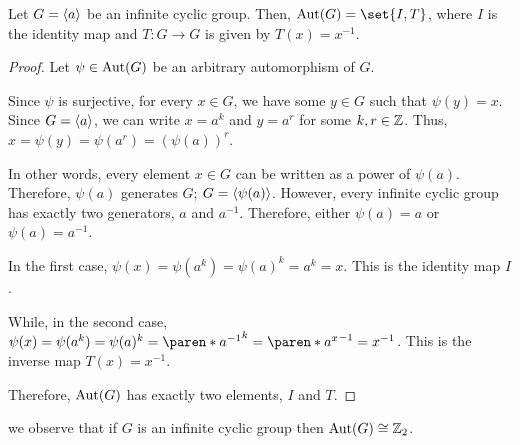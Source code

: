 \documentclass[11pt]{penrose}
\begin{document}
\begin{nthm}
    Let $G = \langle a\rangle$ be an infinite cyclic group. Then, $\Aut(G) = \set{I,T}$, where $I$ is the identity map and $T:G \to G$ is given by $T(x) = x^{-1}$.
\end{nthm}
\begin{proof}
    Let $\psi \in \operatorname{Aut}(G)$ be an arbitrary automorphism of $G$.

    Since $\psi$ is surjective, for every $x \in G$, we have some $y \in G$ such that $\psi(y) = x$. Since $G = \langle a\rangle$, we can write $x = a^{k}$ and $y = a^{r}$ for some $k, r \in \mathbb{Z}$. Thus, $x = \psi(y) = \psi(a^{r}) = (\psi(a))^{r}$.

    In other words, every element $x \in G$ can be written as a power of $\psi(a)$. Therefore, $\psi(a)$ generates $G$; $G = \langle\psi(a)\rangle$. However, every infinite cyclic group has exactly two generators, $a$ and $a^{-1}$. Therefore, either $\psi(a) = a$ or $\psi(a) = a^{-1}$.

    In the first case, $\psi(x) = \psi(a^{k}) = \psi(a)^{k} = a^{k} = x$. This is the identity map $I$.

    While, in the second case, $\psi(x) = \psi(a^{k}) = \psi(a)^{k} = \paren*{a^{-1}}^{k} = \paren*{a^{x}}^{-1} = x^{-1}$. This is the inverse map $T(x) = x^{-1}$.

    Therefore, $\operatorname{Aut}(G)$ has exactly two elements, $I$ and $T$.
\end{proof}

\begin{remark}
    we observe that if $G$ is an infinite cyclic group then $\operatorname{Aut}(G) \mathrel{\cong} \mathbb{Z}_{2}$.
\end{remark}
\end{document}
